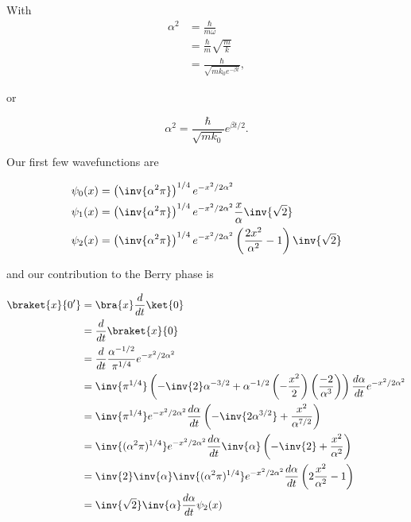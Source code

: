 With
\begin{align*}
\alpha^2 
&= \frac{\hbar}{m \omega} \\
&= \frac{\hbar}{m} \sqrt{\frac{m}{k}} \\
&= \frac{\hbar}{ \sqrt{m k_0 e^{-\beta t} } },
\end{align*}

or

\begin{equation}\label{eqn:qmTwoExamReflection:810}
\alpha^2 
= \frac{\hbar}{ \sqrt{m k_0} }
e^{\beta t/2}.
\end{equation}

Our first few wavefunctions are

\begin{align}\label{eqn:qmTwoExamReflection:830}
\psi_0(x) 
&=
\left(\inv{\alpha^2\pi}\right)^{1/4} e^{- x^2/2 \alpha^2} \\
\psi_1(x) 
&=
\left(\inv{\alpha^2\pi}\right)^{1/4} e^{- x^2/2 \alpha^2} \frac{x}{\alpha} \inv{\sqrt{2}} \\
\psi_2(x) 
&=
\left(\inv{\alpha^2\pi}\right)^{1/4} e^{- x^2/2 \alpha^2} \left( \frac{2 x^2}{\alpha^2} - 1 \right) \inv{\sqrt{2}}
\end{align}

and our contribution to the Berry phase is

\begin{align*}
\braket{x}{0'} 
&=
\bra{x}\frac{d}{dt} \ket{0} \\
&=
\frac{d}{dt} \braket{x}{0} \\
&=
\frac{d}{dt} \frac{\alpha^{-1/2}}{\pi^{1/4}} e^{ - x^2/2 \alpha^2} \\
&=
\inv{\pi^{1/4}}
\left(
  -\inv{2} \alpha^{-3/2}
  + 
  \alpha^{-1/2} \left(-\frac{x^2}{2}\right) \left( \frac{-2}{\alpha^3}\right) 
\right) 
\frac{d\alpha}{dt} 
e^{ - x^2/2 \alpha^2} \\
&=
\inv{\pi^{1/4}} 
e^{ - x^2/2 \alpha^2} 
\frac{d\alpha}{dt} 
\left(
-\inv{2 \alpha^{3/2}} + \frac{x^2}{\alpha^{7/2}}
\right) \\
&=
\inv{(\alpha^2 \pi)^{1/4}} 
e^{ - x^2/2 \alpha^2} 
\frac{d\alpha}{dt} 
\inv{\alpha}
\left(
-\inv{2} + \frac{x^2}{\alpha^2}
\right) \\
&=
\inv{2}
\inv{\alpha}
\inv{(\alpha^2 \pi)^{1/4}} 
e^{ - x^2/2 \alpha^2} 
\frac{d\alpha}{dt} 
\left(
2 \frac{x^2}{\alpha^2} - 1
\right) \\
&=
\inv{\sqrt{2}} \inv{\alpha} 
\frac{d\alpha}{dt} 
\psi_2(x)
\end{align*}

